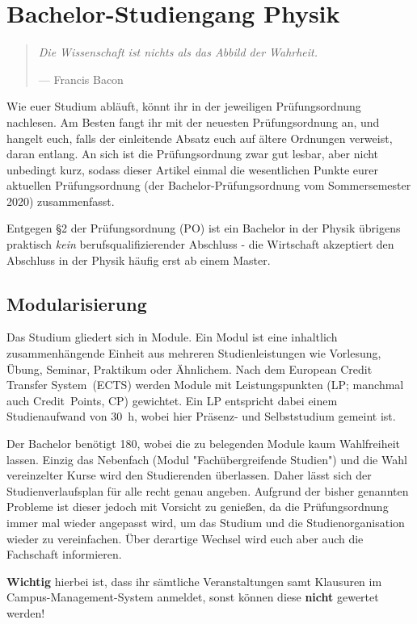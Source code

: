 \section[Bachelor-Studiengang Physik]{Bachelor-Studiengang Physik}
\begin{multicols}{2}
\begin{quote}
	\textit{Die Wissenschaft ist nichts als das Abbild der Wahrheit.}
	
	\hfill--- Francis Bacon
\end{quote}

Wie euer Studium abläuft, könnt ihr in der jeweiligen Prüfungsordnung nachlesen. Am Besten fangt ihr mit der neuesten Prüfungsordnung an, und hangelt euch, falls der einleitende Absatz euch auf ältere Ordnungen verweist, daran entlang. An sich ist die Prüfungsordnung zwar gut lesbar, aber nicht unbedingt kurz, sodass dieser Artikel einmal die wesentlichen Punkte eurer aktuellen Prüfungsordnung (der Bachelor-Prüfungsordnung vom Sommersemester 2020) zusammenfasst.

Entgegen §2 der Prüfungsordnung (PO) ist ein Bachelor in der Physik übrigens praktisch \emph{kein} berufsqualifizierender Abschluss - die Wirtschaft akzeptiert den Abschluss in der Physik häufig erst ab einem Master.

\subsection{Modularisierung}
Das Studium gliedert sich in Module.
Ein Modul ist eine inhaltlich zusammenhängende Einheit aus mehreren Studienleistungen wie Vorlesung, Übung, Seminar, Praktikum oder Ähnlichem.
Nach dem European Credit Transfer System~(ECTS) werden Module mit Leistungspunkten (LP; manchmal auch Credit~Points, CP) gewichtet.
Ein LP entspricht dabei einem Studienaufwand von \SI{30}{\hour}, wobei hier Präsenz- und Selbststudium gemeint ist.

Der Bachelor benötigt \SI{180}{\LP}, wobei die zu belegenden Module kaum Wahlfreiheit lassen.
Einzig das Nebenfach (Modul "Fachübergreifende Studien") und die Wahl vereinzelter Kurse wird den Studierenden überlassen.
Daher lässt sich der Studienverlaufsplan für alle recht genau angeben.
Aufgrund der bisher genannten Probleme ist dieser jedoch mit Vorsicht zu genießen, da die Prüfungsordnung immer mal wieder angepasst wird, um das Studium und die Studienorganisation wieder zu vereinfachen.
Über derartige Wechsel wird euch aber auch die Fachschaft informieren.

\textbf{Wichtig} hierbei ist, dass ihr sämtliche Veranstaltungen samt Klausuren im Campus-Management-System anmeldet, sonst können diese \textbf{nicht} gewertet werden!\\


\end{multicols}
